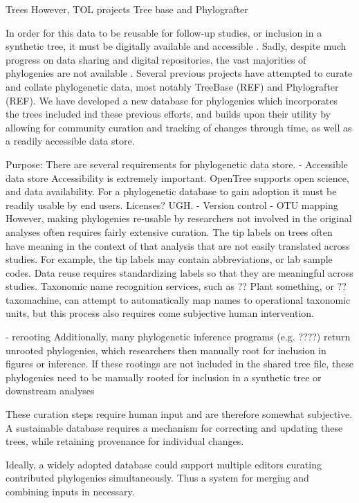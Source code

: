 \documentclass[a4paper,10pt]{article}
\begin{document}
Trees 
     However,
     TOL projects
     Tree base and Phylografter

In order for this data to be reusable for follow-up studies, or inclusion in a synthetic tree, it must be digitally available and accessible \cite{Cranston Harmon etc}.
Sadly, despite much progress on data sharing and digital repositories, the vast majorities of phylogenies are not available \cite{Drew}.
Several previous projects have attempted to curate and collate phylogenetic data, most notably TreeBase (REF) and Phylografter (REF).
We have developed a new database for phylogenies which incorporates the trees included ind these previous efforts, 
and builds upon their utility by allowing for community curation and tracking of changes through time, as well as a readily accessible data store.

  Purpose:
There are several requirements for phylogenetic data store.
      - Accessible data store
Accessibility is extremely important.
OpenTree supports open science, and data availability.
For a phylogenetic database to gain adoption it must be readily usable by end users.
Licenses? UGH.
          - Version control
          - OTU mapping
However, making phylogenies re-usable by researchers not involved in the original analyses often requires fairly extensive curation.
The tip labels on trees often have meaning in the context of that analysis that are not easily translated across studies. 
For example, the tip labels may contain abbreviations, or lab sample codes.
Data reuse requires standardizing labels so that they are meaningful across studies.
Taxonomic name recognition services, such as ?? Plant something, or ?? taxomachine, can attempt to automatically map names to
operational taxonomic units, but this process also requires come subjective human intervention. 

          - rerooting
Additionally, many phylogenetic inference programs (e.g. ????) return unrooted phylogenies, 
which researchers then manually root for inclusion in figures or inference. 
If these rootings are not included in the shared tree file, 
these phylogenies need to be manually rooted for inclusion in a synthetic tree or downstream analyses

These curation steps require human input and are therefore somewhat subjective.
A sustainable database requires a mechanism for correcting and updating these trees,
while retaining provenance for individual changes.

Ideally, a widely adopted database could support multiple editors curating contributed phylogenies simultaneously.
Thus a system for merging and combining inputs in necessary.
\end{document}
